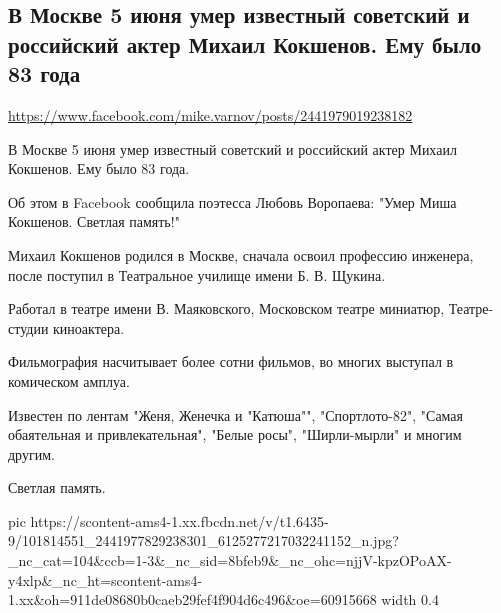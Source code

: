  
 
 
 
 

\subsection{В Москве 5 июня умер известный советский и российский актер Михаил Кокшенов. Ему было 83 года}
\label{sec:05_06_2020.fb.varnov_mike.1.kokshenov_mihail_smert_83_goda}
\url{https://www.facebook.com/mike.varnov/posts/2441979019238182}

В Москве 5 июня умер известный советский и российский актер Михаил Кокшенов. Ему было 83 года. 

Об этом в Facebook сообщила поэтесса Любовь Воропаева: "Умер Миша Кокшенов. Светлая память!"

Михаил Кокшенов родился в Москве, сначала освоил профессию инженера, после поступил в Театральное училище имени Б. В. Щукина. 

Работал в театре имени В. Маяковского, Московском театре миниатюр, Театре-студии киноактера.

Фильмография насчитывает более сотни фильмов, во многих выступал в комическом амплуа. 

Известен по лентам "Женя, Женечка и "Катюша"", "Спортлото-82", "Самая обаятельная и привлекательная", "Белые росы", "Ширли-мырли" и многим другим.

Светлая память.


\ifcmt
  pic https://scontent-ams4-1.xx.fbcdn.net/v/t1.6435-9/101814551_2441977829238301_6125277217032241152_n.jpg?_nc_cat=104&ccb=1-3&_nc_sid=8bfeb9&_nc_ohc=njjV-kpzOPoAX-y4xlp&_nc_ht=scontent-ams4-1.xx&oh=911de08680b0caeb29fef4f904d6c496&oe=60915668
  width 0.4
\fi

